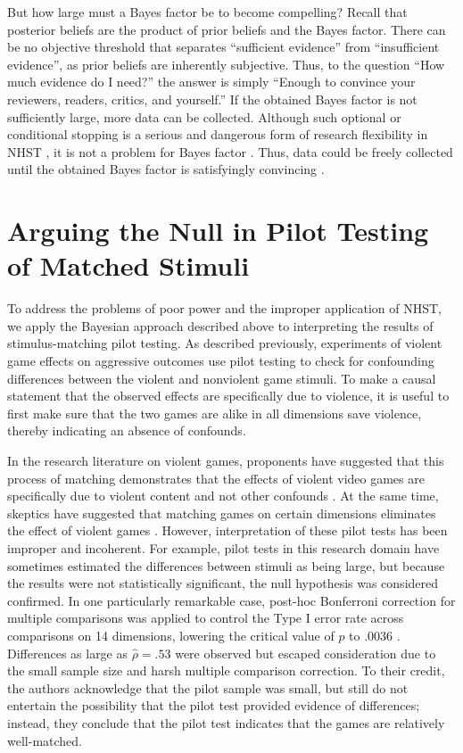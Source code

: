 \documentclass[man]{apa6}
\begin{document}
But how large must a Bayes factor be to become compelling? Recall that posterior beliefs are the product of prior beliefs and the Bayes factor. There can be no objective threshold that separates ``sufficient evidence'' from ``insufficient evidence'', as prior beliefs are inherently subjective. Thus, to the question ``How much evidence do I need?'' the answer is simply ``Enough to convince your reviewers, readers, critics, and yourself.'' 
If the obtained Bayes factor is not sufficiently large, more data can be collected. Although such optional or conditional stopping is a serious and dangerous form of research flexibility in NHST \citep{Simmons:etal:2011}, it is not a problem for Bayes factor \citep{Dienes:2011,Rouder:2014}. 
Thus, data could be freely collected until the obtained Bayes factor is satisfyingly convincing \citep[e.g.,][]{Matzke:etal:2015}.

\section{Arguing the Null in Pilot Testing of Matched Stimuli}
To address the problems of poor power and the improper application of NHST, we apply the Bayesian approach described above to interpreting the results of stimulus-matching pilot testing.  As described previously, experiments of violent game effects on aggressive outcomes use pilot testing to check for confounding differences between the violent and nonviolent game stimuli. To make a causal statement that the observed effects are specifically due to violence, it is useful to first make sure that the two games are alike in all dimensions save violence, thereby indicating an absence of confounds. 

In the research literature on violent games, proponents have suggested that this process of matching demonstrates that the effects of violent video games are specifically due to violent content and not other confounds \citep{Anderson:etal:2004}. At the same time, skeptics have suggested that matching games on certain dimensions eliminates the effect of violent games \citep{Adachi:Willoughby:2011}. However, interpretation of these pilot tests has been improper and incoherent. For example, pilot tests in this research domain have sometimes estimated the differences between stimuli as being large, but because the results were not statistically significant, the null hypothesis was considered confirmed. In one particularly remarkable case, post-hoc Bonferroni correction for multiple comparisons was applied to control the Type I error rate across comparisons on 14 dimensions, lowering the critical value of $p$ to .0036 \citep{Arriaga:etal:2008}. Differences as large as $\hat{\rho} = .53$ were observed but escaped consideration due to the small sample size and harsh multiple comparison correction. To their credit, the authors acknowledge that the pilot sample was small, but still do not entertain the possibility that the pilot test provided evidence of differences; instead, they conclude that the pilot test indicates that the games are relatively well-matched.
\end{document}

